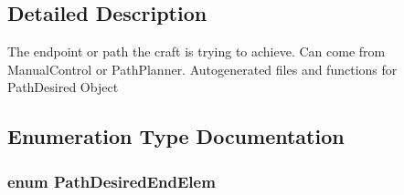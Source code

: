 \subsection{\-Detailed \-Description}
\-The endpoint or path the craft is trying to achieve. \-Can come from \-Manual\-Control or \-Path\-Planner. \-Autogenerated files and functions for \-Path\-Desired \-Object 

\subsection{\-Enumeration \-Type \-Documentation}
\hypertarget{group___path_desired_ga0609d99491ed429a75fbac01b867f701}{
\subsubsection[{\-Path\-Desired\-End\-Elem}]{\setlength{\rightskip}{0pt plus 5cm}enum {\bf \-Path\-Desired\-End\-Elem}}}\label{group___path_desired_ga0609d99491ed429a75fbac01b867f701}
